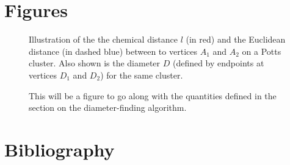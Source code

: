 \documentclass[aps, preprint, groupedaddress]{revtex4}
\begin{document}
\section{Figures}
\begin{figure}[h]
\begin{center}
\caption{\label{fig:griddotschemdiamlabel} Illustration of the the chemical distance $l$ (in red) and the Euclidean distance (in dashed blue) between to vertices $A_1$ and $A_2$ on a Potts cluster.  Also shown is the diameter $D$ (defined by endpoints at vertices $D_1$ and $D_2$) for the same cluster.}
\end{center}
\end{figure}

\begin{figure}[h]
\begin{center}
\caption{\label{fig:diamfind} This will be a figure to go along with the quantities defined in the section on the diameter-finding algorithm.}
\end{center}
\end{figure}

\section{Bibliography}


\end{document}
